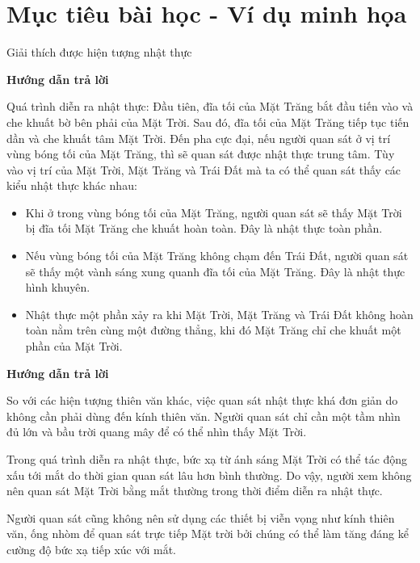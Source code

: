 \section{Mục tiêu bài học - Ví dụ minh họa}
\begin{dang}{Giải thích được hiện tượng nhật thực}
	{	\begin{center}
			\textbf{Hướng dẫn trả lời}
		\end{center}
		
		Quá trình diễn ra nhật thực: Đầu tiên, đĩa tối của Mặt Trăng bắt đầu tiến vào và che khuất bờ bên phải của Mặt Trời. Sau đó, đĩa tối của Mặt Trăng tiếp tục tiến dần và che khuất tâm Mặt Trời. Đến pha cực đại, nếu người quan sát ở vị trí vùng bóng tối của Mặt Trăng, thì sẽ quan sát được nhật thực trung tâm. Tùy vào vị trí của Mặt Trời, Mặt Trăng và Trái Đất mà ta có thể quan sát thấy các kiểu nhật thực khác nhau:
		\begin{itemize}
			\item Khi ở trong vùng bóng tối của Mặt Trăng, người quan sát sẽ thấy Mặt Trời bị đĩa tối Mặt Trăng che khuất hoàn toàn. Đây là nhật thực toàn phần.
			\item Nếu vùng bóng tối của Mặt Trăng không chạm đến Trái Đất, người quan sát sẽ thấy một vành sáng xung quanh đĩa tối của Mặt Trăng. Đây là nhật thực hình khuyên.
			\item Nhật thực một phần xảy ra khi Mặt Trời, Mặt Trăng và Trái Đất không hoàn toàn nằm trên cùng một đường thẳng, khi đó Mặt Trăng chỉ che khuất một phần của Mặt Trời.
		\end{itemize}
	}
	{	\begin{center}
			\textbf{Hướng dẫn trả lời}
		\end{center}
		
		So với các hiện tượng thiên văn khác, việc quan sát nhật thực khá đơn giản do không cần phải dùng đến kính thiên văn. Người quan sát chỉ cần một tầm nhìn đủ lớn và bầu trời quang mây để có thể nhìn thấy Mặt Trời. 
		
		Trong quá trình diễn ra nhật thực, bức xạ từ ánh sáng Mặt Trời có thể tác động xấu tới mắt do thời gian quan sát lâu hơn bình thường. Do vậy, người xem không nên quan sát Mặt Trời bằng mắt thường trong thời điểm diễn ra nhật thực. 
		
		Người quan sát cũng không nên sử dụng các thiết bị viễn vọng như kính thiên văn, ống nhòm để quan sát trực tiếp Mặt trời bởi chúng có thể làm tăng đáng kể cường độ bức xạ tiếp xúc với mắt.
		
}
\end{dang}
